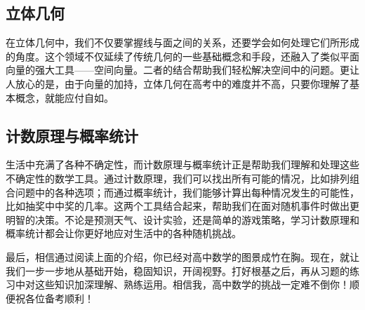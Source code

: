 \subsection{立体几何}

在立体几何中，我们不仅要掌握线与面之间的关系，还要学会如何处理它们所形成的角度。这个领域不仅延续了传统几何的一些基础概念和手段，还融入了类似平面向量的强大工具——空间向量。二者的结合帮助我们轻松解决空间中的问题。更让人放心的是，由于向量的加持，立体几何在高考中的难度并不高，只要你理解了基本概念，就能应付自如。

\subsection{计数原理与概率统计}

生活中充满了各种不确定性，而计数原理与概率统计正是帮助我们理解和处理这些不确定性的数学工具。通过计数原理，我们可以找出所有可能的情况，比如排列组合问题中的各种选项；而通过概率统计，我们能够计算出每种情况发生的可能性，比如抽奖中中奖的几率。这两个工具结合起来，帮助我们在面对随机事件时做出更明智的决策。不论是预测天气、设计实验，还是简单的游戏策略，学习计数原理和概率统计都会让你更好地应对生活中的各种随机挑战。

最后，相信通过阅读上面的介绍，你已经对高中数学的图景成竹在胸。现在，就让我们一步一步地从基础开始，稳固知识，开阔视野。打好根基之后，再从习题的练习中对这些知识加深理解、熟练运用。相信我，高中数学的挑战一定难不倒你！顺便祝各位备考顺利！







